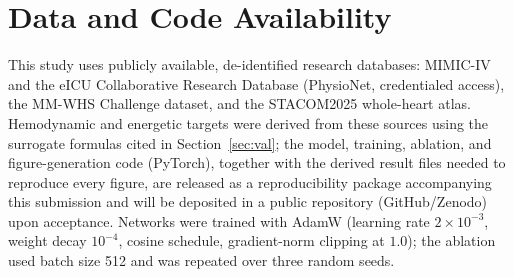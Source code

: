 \documentclass[journal]{IEEEtran}
\begin{document}
\section*{Data and Code Availability}
This study uses publicly available, de-identified research databases: MIMIC-IV and the eICU Collaborative Research Database (PhysioNet, credentialed access), the MM-WHS Challenge dataset, and the STACOM2025 whole-heart atlas. Hemodynamic and energetic targets were derived from these sources using the surrogate formulas cited in Section~\ref{sec:val}; the model, training, ablation, and figure-generation code (PyTorch), together with the derived result files needed to reproduce every figure, are released as a reproducibility package accompanying this submission and will be deposited in a public repository (GitHub/Zenodo) upon acceptance. Networks were trained with AdamW (learning rate $2\times10^{-3}$, weight decay $10^{-4}$, cosine schedule, gradient-norm clipping at $1.0$); the ablation used batch size 512 and was repeated over three random seeds.


\end{document}
